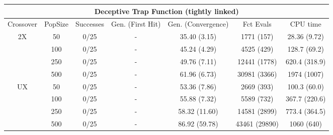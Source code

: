 \documentclass[]{scrartcl}
\begin{document}
\begin{table}
	\small
	\tabcolsep=0.09cm
	\begin{tabular}{|c|c|c|c|c|c|c|}
		\hline
		\multicolumn{7}{|c|}{Deceptive Trap Function (tightly linked)}                                                    \\ \hline
		Crossover           & PopSize & Successes & Gen. (First Hit) & Gen. (Convergence) & Fct Evals     & CPU time      \\ \hline
		\multirow{4}{*}{2X} & 50      & 0/25      & -                & 35.40 (3.15)       & 1771 (157)    & 28.36 (9.72)  \\ \cline{2-7} 
		& 100     & 0/25      & -                & 45.24 (4.29)       & 4525 (429)    & 128.7 (69.2)  \\ \cline{2-7} 
		& 250     & 0/25      & -                & 49.76 (7.11)       & 12441 (1778)  & 620.4 (318.9) \\ \cline{2-7} 
		& 500     & 0/25      & -                & 61.96 (6.73)       & 30981 (3366)  & 1974 (1007)   \\ \hline
		\multirow{4}{*}{UX} & 50      & 0/25      & -                & 53.36 (7.86)       & 2669 (393)    & 100.3 (60.0)  \\ \cline{2-7} 
		& 100     & 0/25      & -                & 55.88 (7.32)       & 5589 (732)    & 367.7 (220.6) \\ \cline{2-7} 
		& 250     & 0/25      & -                & 58.32 (11.60)      & 14581 (2899)  & 773.4 (364.5) \\ \cline{2-7} 
		& 500     & 0/25      & -                & 86.92 (59.78)      & 43461 (29890) & 1060 (640)    \\ \hline
	\end{tabular}
\end{table}
\end{document}
